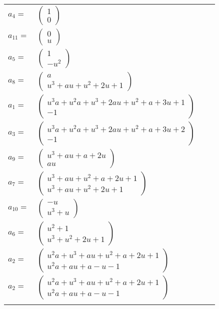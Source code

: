 \documentclass[1p]{elsarticle_modified}
\theoremstyle{definition}
\begin{document}
\begin{tabular}{m{7pt} m{180pt} m{7pt} m{180pt} }
\flushright $a_{4}=$&$\begin{pmatrix}1\\0\end{pmatrix}$ \\
\flushright $a_{11}=$&$\begin{pmatrix}0\\u\end{pmatrix}$ \\
\flushright $a_{5}=$&$\begin{pmatrix}1\\- u^2\end{pmatrix}$ \\
\flushright $a_{8}=$&$\begin{pmatrix}a\\u^3+a u+u^2+2 u+1\end{pmatrix}$ \\
\flushright $a_{1}=$&$\begin{pmatrix}u^3 a+u^2 a+u^3+2 a u+u^2+a+3 u+1\\-1\end{pmatrix}$ \\
\flushright $a_{3}=$&$\begin{pmatrix}u^3 a+u^2 a+u^3+2 a u+u^2+a+3 u+2\\-1\end{pmatrix}$ \\
\flushright $a_{9}=$&$\begin{pmatrix}u^3+a u+a+2 u\\a u\end{pmatrix}$ \\
\flushright $a_{7}=$&$\begin{pmatrix}u^3+a u+u^2+a+2 u+1\\u^3+a u+u^2+2 u+1\end{pmatrix}$ \\
\flushright $a_{10}=$&$\begin{pmatrix}- u\\u^3+u\end{pmatrix}$ \\
\flushright $a_{6}=$&$\begin{pmatrix}u^2+1\\u^3+u^2+2 u+1\end{pmatrix}$ \\
\flushright $a_{2}=$&$\begin{pmatrix}u^2 a+u^3+a u+u^2+a+2 u+1\\u^2 a+a u+a- u-1\end{pmatrix}$\\ \flushright $a_{2}=$&$\begin{pmatrix}u^2 a+u^3+a u+u^2+a+2 u+1\\u^2 a+a u+a- u-1\end{pmatrix}$\\&\end{tabular}
\end{document}
